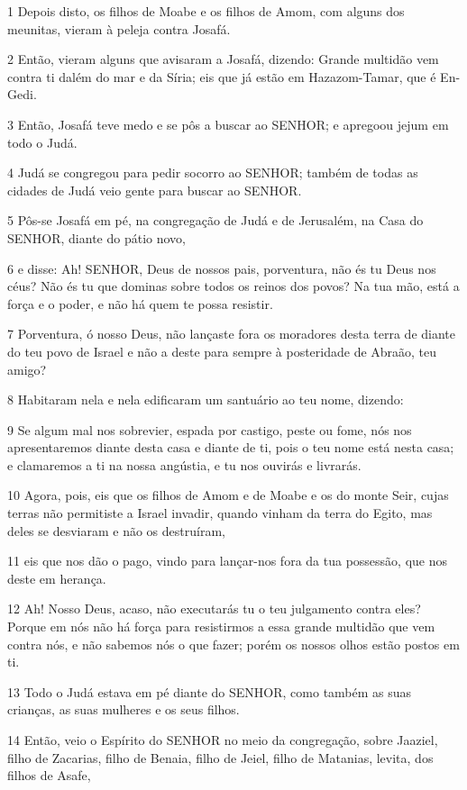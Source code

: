 \par 1 Depois disto, os filhos de Moabe e os filhos de Amom, com alguns dos meunitas, vieram à peleja contra Josafá.
\par 2 Então, vieram alguns que avisaram a Josafá, dizendo: Grande multidão vem contra ti dalém do mar e da Síria; eis que já estão em Hazazom-Tamar, que é En-Gedi.
\par 3 Então, Josafá teve medo e se pôs a buscar ao SENHOR; e apregoou jejum em todo o Judá.
\par 4 Judá se congregou para pedir socorro ao SENHOR; também de todas as cidades de Judá veio gente para buscar ao SENHOR.
\par 5 Pôs-se Josafá em pé, na congregação de Judá e de Jerusalém, na Casa do SENHOR, diante do pátio novo,
\par 6 e disse: Ah! SENHOR, Deus de nossos pais, porventura, não és tu Deus nos céus? Não és tu que dominas sobre todos os reinos dos povos? Na tua mão, está a força e o poder, e não há quem te possa resistir.
\par 7 Porventura, ó nosso Deus, não lançaste fora os moradores desta terra de diante do teu povo de Israel e não a deste para sempre à posteridade de Abraão, teu amigo?
\par 8 Habitaram nela e nela edificaram um santuário ao teu nome, dizendo:
\par 9 Se algum mal nos sobrevier, espada por castigo, peste ou fome, nós nos apresentaremos diante desta casa e diante de ti, pois o teu nome está nesta casa; e clamaremos a ti na nossa angústia, e tu nos ouvirás e livrarás.
\par 10 Agora, pois, eis que os filhos de Amom e de Moabe e os do monte Seir, cujas terras não permitiste a Israel invadir, quando vinham da terra do Egito, mas deles se desviaram e não os destruíram,
\par 11 eis que nos dão o pago, vindo para lançar-nos fora da tua possessão, que nos deste em herança.
\par 12 Ah! Nosso Deus, acaso, não executarás tu o teu julgamento contra eles? Porque em nós não há força para resistirmos a essa grande multidão que vem contra nós, e não sabemos nós o que fazer; porém os nossos olhos estão postos em ti.
\par 13 Todo o Judá estava em pé diante do SENHOR, como também as suas crianças, as suas mulheres e os seus filhos.
\par 14 Então, veio o Espírito do SENHOR no meio da congregação, sobre Jaaziel, filho de Zacarias, filho de Benaia, filho de Jeiel, filho de Matanias, levita, dos filhos de Asafe,
